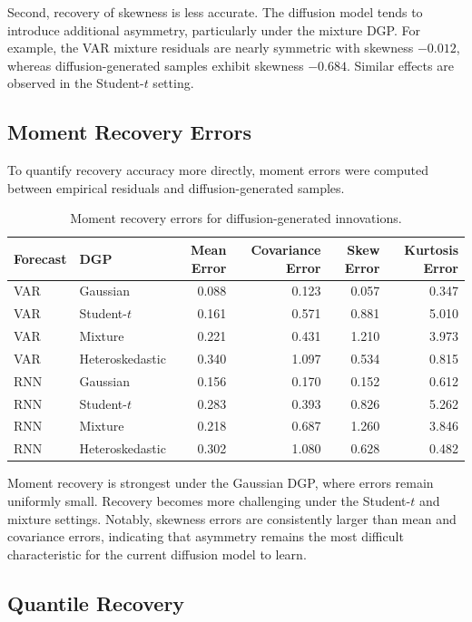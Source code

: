 \documentclass[11pt]{article}
\begin{document}
Second, recovery of skewness is less accurate. The diffusion model tends to introduce additional asymmetry, particularly under the mixture DGP. For example, the VAR mixture residuals are nearly symmetric with skewness \(-0.012\), whereas diffusion-generated samples exhibit skewness \(-0.684\). Similar effects are observed in the Student-\(t\) setting.

\subsection*{Moment Recovery Errors}

To quantify recovery accuracy more directly, moment errors were computed between empirical residuals and diffusion-generated samples.

\begin{table}[H]
\centering
\caption{Moment recovery errors for diffusion-generated innovations.}
\label{tab:diffusion_moment_errors}
\small
\begin{tabular}{llrrrr}
\toprule
Forecast & DGP & Mean Error & Covariance Error & Skew Error & Kurtosis Error \\
\midrule
VAR & Gaussian & 0.088 & 0.123 & 0.057 & 0.347 \\
VAR & Student-\(t\) & 0.161 & 0.571 & 0.881 & 5.010 \\
VAR & Mixture & 0.221 & 0.431 & 1.210 & 3.973 \\
VAR & Heteroskedastic & 0.340 & 1.097 & 0.534 & 0.815 \\
\midrule
RNN & Gaussian & 0.156 & 0.170 & 0.152 & 0.612 \\
RNN & Student-\(t\) & 0.283 & 0.393 & 0.826 & 5.262 \\
RNN & Mixture & 0.218 & 0.687 & 1.260 & 3.846 \\
RNN & Heteroskedastic & 0.302 & 1.080 & 0.628 & 0.482 \\
\bottomrule
\end{tabular}
\end{table}

Moment recovery is strongest under the Gaussian DGP, where errors remain uniformly small. Recovery becomes more challenging under the Student-\(t\) and mixture settings. Notably, skewness errors are consistently larger than mean and covariance errors, indicating that asymmetry remains the most difficult characteristic for the current diffusion model to learn.

\subsection*{Quantile Recovery}
\end{document}
